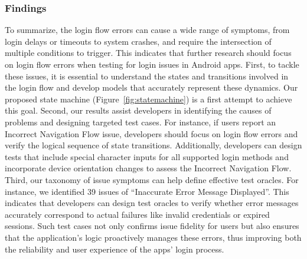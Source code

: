 \subsubsection{Findings}
To summarize, the login flow errors can cause a wide range of symptoms, from login delays or timeouts to system crashes, and require the intersection of multiple conditions to trigger.
This indicates that further research should focus on login flow errors when testing for login issues in Android apps. First, to tackle these issues, it is essential to understand the states and transitions involved in the login flow and develop models that accurately represent these dynamics.
Our proposed state machine (Figure~\ref{fig:statemachine}) is a first attempt to achieve this goal.
Second, our results assist developers in identifying the causes of problems and designing targeted test cases. For instance, if users report an Incorrect Navigation Flow issue, developers should focus on login flow errors and verify the logical sequence of state transitions.
Additionally, developers can design tests that include special character inputs for all supported login methods and incorporate device orientation changes to assess the Incorrect Navigation Flow.
Third, our taxonomy of issue symptoms can help define effective test oracles. For instance, we identified 39 issues of “Inaccurate Error Message Displayed”. This indicates that developers can design test oracles to verify whether error messages accurately correspond to actual failures like invalid credentials or expired sessions.
Such test cases not only confirms issue fidelity for users but also ensures that the application's logic proactively manages these errors, thus improving both the reliability and user experience of the apps' login process. %